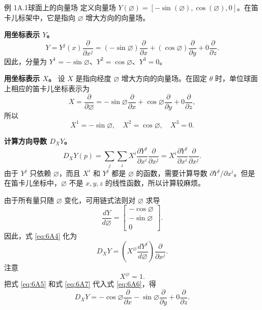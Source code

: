 \begin{statement}{例 1A.1}{球面上的向量场}
定义向量场 $Y(\varnothing)=[-\sin(\varnothing),\cos(\varnothing),0]$。在笛卡儿标架中，它是指向 $\varnothing$ 增大方向的向量场。

\textbf{用坐标表示 $Y$。}
\[
  Y=Y^j(x)\frac{\partial}{\partial x^j}
   =(-\sin\varnothing)\frac{\partial}{\partial x}
    +(\cos\varnothing)\frac{\partial}{\partial y}
    +0\frac{\partial}{\partial z}.
\]
因此，分量为 $Y^1=-\sin\varnothing$、$Y^2=\cos\varnothing$、$Y^3=0$。

\textbf{用坐标表示 $X$。}
设 $X$ 是指向经度 $\varnothing$ 增大方向的向量场。在固定 $\theta$ 时，单位球面上相应的笛卡儿坐标表示为%
%
\[
  X=\frac{\partial}{\partial\varnothing}
    =-\sin\varnothing\frac{\partial}{\partial x}
     +\cos\varnothing\frac{\partial}{\partial y}
     +0\frac{\partial}{\partial z},
\]
所以
\[
  X^1=-\sin\varnothing,\quad X^2=\cos\varnothing,\quad X^3=0.
\]

\textbf{计算方向导数 $D_XY$。}
\[
  D_XY(p)=\sum_j\sum_i X^i\frac{\partial Y^j}{\partial x^i}\frac{\partial}{\partial x^j}
     =X^i\frac{\partial Y^j}{\partial x^i}\frac{\partial}{\partial x^j}.
\]
由于 $Y^j$ 只依赖 $\varnothing$，而且 $X^i$ 和 $Y^j$ 都是 $\varnothing$ 的函数，需要计算导数 $\partial Y^j/\partial x^i$。但是在笛卡儿坐标中，$\varnothing$ 不是 $x,y,z$ 的线性函数，所以计算较麻烦。

由于所有量只随 $\varnothing$ 变化，可用链式法则对 $\varnothing$ 求导
\begin{equation*}
  \frac{dY}{d\varnothing}
   =\begin{bmatrix}-\cos\varnothing\\-\sin\varnothing\\0\end{bmatrix}.
  \tag{6A5}\label{eq:6A5}
\end{equation*}
因此，式 \eqref{eq:6A4} 化为
\begin{equation*}
  D_XY=\left(X^\varnothing\frac{dY^j}{d\varnothing}\right)
      \frac{\partial}{\partial x^j}.
  \tag{6A6}\label{eq:6A6}
\end{equation*}
注意
\begin{equation*}
  X^\varnothing=1.
  \tag{6A7}\label{eq:6A7}
\end{equation*}
把式 \eqref{eq:6A5} 和式 \eqref{eq:6A7} 代入式 \eqref{eq:6A6}，得
\begin{equation*}
  D_XY=-\cos\varnothing\frac{\partial}{\partial x}
        -\sin\varnothing\frac{\partial}{\partial y}
        +0\frac{\partial}{\partial z}.
  \tag{6A8}\label{eq:6A8}
\end{equation*}
\end{statement}

